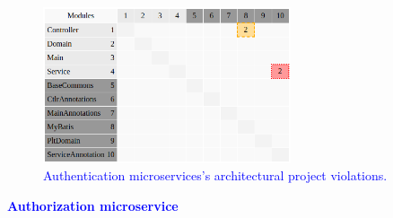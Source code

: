 \documentclass[12pt]{article}
\begin{document}
\begin{figure}[ht]
\centering
\includegraphics[width=0.65\textwidth]{figuras/violacoesAuthentication.png}
\caption{\textcolor{blue}{Authentication microservices's architectural project violations.}}
\label{fig:microservices}
\end{figure}
\newpage
\noindent\textbf{\textcolor{blue}{Authorization microservice}}
\label{sec:ApendiceAuthorization}
\end{document}
